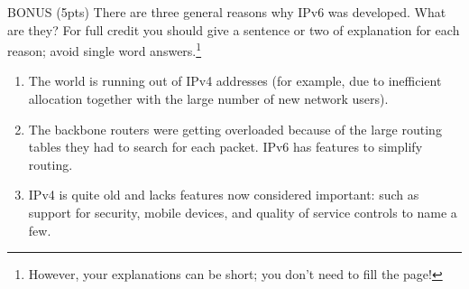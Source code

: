 \documentclass[12pt]{examdesign}
\begin{document}
\begin{shortanswer}

  \begin{question}
    BONUS (5pts) There are three general reasons why IPv6 was developed. What are they? For full
    credit you should give a sentence or two of explanation for each reason; avoid single word
    answers.\footnote{However, your explanations can be short; you don't need to fill the page!}

    \begin{answer}
    \begin{enumerate}
    \item The world is running out of IPv4 addresses (for example, due to inefficient allocation
      together with the large number of new network users).
    \item The backbone routers were getting overloaded because of the large routing tables they
      had to search for each packet. IPv6 has features to simplify routing.
    \item IPv4 is quite old and lacks features now considered important: such as support for
      security, mobile devices, and quality of service controls to name a few.
    \end{enumerate}
    \end{answer}
  \end{question}

\end{shortanswer}
\end{document}
